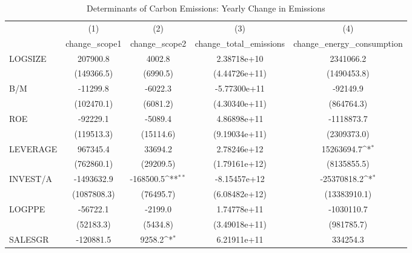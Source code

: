 \begin{table}[htbp]\centering
\def\sym#1{\ifmmode^{#1}\else\(^{#1}\)\fi}
\caption{Determinants of Carbon Emissions: Yearly Change in Emissions}
\begin{tabular}{l*{4}{c}}
\hline\hline
                    &\multicolumn{1}{c}{(1)}&\multicolumn{1}{c}{(2)}&\multicolumn{1}{c}{(3)}&\multicolumn{1}{c}{(4)}\\
                    &\multicolumn{1}{c}{change\_scope1}&\multicolumn{1}{c}{change\_scope2}&\multicolumn{1}{c}{change\_total\_emissions}&\multicolumn{1}{c}{change\_energy\_consumption}\\
\hline
LOGSIZE             &    207900.8         &      4002.8         & 2.38718e+10         &   2341066.2         \\
                    &  (149366.5)         &    (6990.5)         &(4.44726e+11)         & (1490453.8)         \\
B/M                 &    -11299.8         &     -6022.3         &-5.77300e+11         &    -92149.9         \\
                    &  (102470.1)         &    (6081.2)         &(4.30340e+11)         &  (864764.3)         \\
ROE                 &    -92229.1         &     -5089.4         & 4.86898e+11         &  -1118873.7         \\
                    &  (119513.3)         &   (15114.6)         &(9.19034e+11)         & (2309373.0)         \\
LEVERAGE            &    967345.4         &     33694.2         & 2.78246e+12         &  15263694.7\sym{*}  \\
                    &  (762860.1)         &   (29209.5)         &(1.79161e+12)         & (8135855.5)         \\
INVEST/A            &  -1493632.9         &   -168500.5\sym{**} &-8.15457e+12         & -25370818.2\sym{*}  \\
                    & (1087808.3)         &   (76495.7)         &(6.08482e+12)         &(13383910.1)         \\
LOGPPE              &    -56722.1         &     -2199.0         & 1.74778e+11         &  -1030110.7         \\
                    &   (52183.3)         &    (5434.8)         &(3.49018e+11)         &  (981785.7)         \\
SALESGR             &   -120881.5         &      9258.2\sym{*}  & 6.21911e+11         &    334254.3         \\

\end{tabular}
\end{table}
